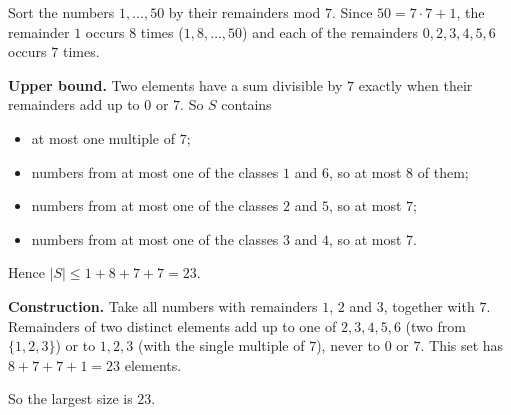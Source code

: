 Sort the numbers $1,\ldots,50$ by their remainders mod $7$. Since $50=7\cdot7+1$, the remainder $1$ occurs $8$ times ($1,8,\ldots,50$) and each of the remainders $0,2,3,4,5,6$ occurs $7$ times.

\textbf{Upper bound.} Two elements have a sum divisible by $7$ exactly when their remainders add up to $0$ or $7$. So $S$ contains
\begin{itemize}
\item at most one multiple of $7$;
\item numbers from at most one of the classes $1$ and $6$, so at most $8$ of them;
\item numbers from at most one of the classes $2$ and $5$, so at most $7$;
\item numbers from at most one of the classes $3$ and $4$, so at most $7$.
\end{itemize}
Hence $|S|\le1+8+7+7=23$.

\textbf{Construction.} Take all numbers with remainders $1$, $2$ and $3$, together with $7$. Remainders of two distinct elements add up to one of $2,3,4,5,6$ (two from $\{1,2,3\}$) or to $1,2,3$ (with the single multiple of $7$), never to $0$ or $7$. This set has $8+7+7+1=23$ elements.

So the largest size is $\boxed{23}$.
